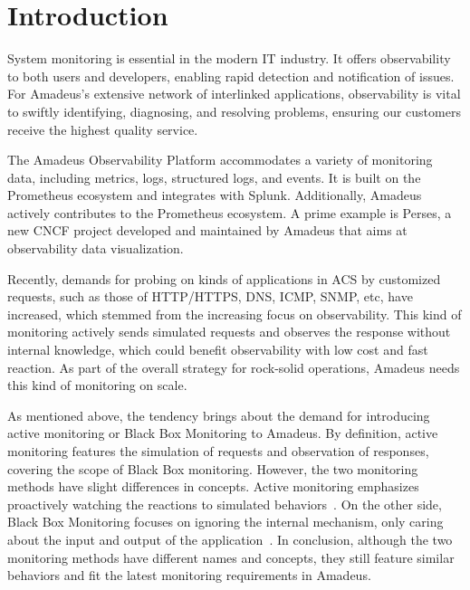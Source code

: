 
\chapter{Introduction}\label{chapter:introduction}

System monitoring is essential in the modern \ac{IT} industry. It offers observability to both users and developers, enabling rapid detection and notification of issues. For Amadeus's extensive network of interlinked applications, observability is vital to swiftly identifying, diagnosing, and resolving problems, ensuring our customers receive the highest quality service. 

The Amadeus Observability Platform accommodates a variety of monitoring data, including metrics, logs, structured logs, and events. It is built on the Prometheus ecosystem and integrates with Splunk. Additionally, Amadeus actively contributes to the Prometheus ecosystem. A prime example is Perses, a new CNCF project developed and maintained by Amadeus that aims at observability data visualization. 

Recently, demands for probing on kinds of applications in \ac{ACS} by customized requests, such as those of \ac{HTTP}/\ac{HTTPS}, \ac{DNS}, \ac{ICMP}, \ac{SNMP}, etc, have increased, which stemmed from the increasing focus on observability. This kind of monitoring actively sends simulated requests and observes the response without internal knowledge, which could benefit observability with low cost and fast reaction. As part of the overall strategy for rock-solid operations, Amadeus needs this kind of monitoring on scale. 

As mentioned above, the tendency brings about the demand for introducing active monitoring or Black Box Monitoring to Amadeus. By definition, active monitoring features the simulation of requests and observation of responses, covering the scope of Black Box monitoring. However, the two monitoring methods have slight differences in concepts. Active monitoring emphasizes proactively watching the reactions to simulated behaviors~\parencite{splunkActiveVsPassive2023}. On the other side, Black Box Monitoring focuses on ignoring the internal mechanism, only caring about the input and output of the application~\parencite{beyerSiteReliabilityEngineering2016}. In conclusion, although the two monitoring methods have different names and concepts, they still feature similar behaviors and fit the latest monitoring requirements in Amadeus. 

